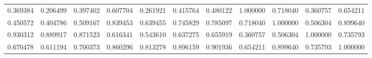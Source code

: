 \begin{table}
\begin{tabular}{lcr}
0.369384 & 0.206499 & 0.397402 & 0.607704 & 0.261921 & 0.415764 & 0.480122 & 1.000000 & 0.718040 & 0.360757 & 0.654211 \\
0.450572 & 0.404786 & 0.509167 & 0.839453 & 0.639455 & 0.745829 & 0.785097 & 0.718040 & 1.000000 & 0.506304 & 0.899640 \\
0.930312 & 0.889917 & 0.871523 & 0.616341 & 0.543610 & 0.637275 & 0.655919 & 0.360757 & 0.506304 & 1.000000 & 0.735793 \\
0.670478 & 0.611194 & 0.700373 & 0.860296 & 0.813278 & 0.896159 & 0.901936 & 0.654211 & 0.899640 & 0.735793 & 1.000000 \\
\bottomrule
\end{tabular}
\end{table}
